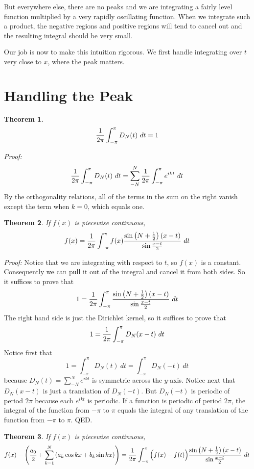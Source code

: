 \documentclass[11pt, oneside]{amsart}
\newtheorem{theorem}{Theorem}
\begin{document}
But everywhere else, there are no peaks and we are integrating a fairly level function multiplied by a very rapidly oscillating function. When we integrate such a product, the negative regions and positive regions will tend to cancel out and the resulting integral should be very small.

Our job is now to make this intuition rigorous. We first handle integrating over $t$ very close to $x$, where the peak matters.

\section{Handling the Peak}


\begin{theorem}
$${1 \over {2 \pi}} \int_{- \pi}^\pi D_N(t)\ dt = 1$$
\end{theorem}

{\em Proof:}
	$${1 \over {2 \pi}} \int_{- \pi}^\pi D_N(t)\ dt = \sum_{-N}^N {1 \over {2 \pi}} \int_{- \pi}^\pi e^{ikt} \ dt$$
	By the orthogonality relations, all of the terms in the sum on the right vanish except the term when $k = 0$, which equals one.

\begin{theorem} If $f(x)$ is piecewise continuous,
$$f(x) =  {1 \over {2 \pi}} \int_{- \pi}^\pi f(x)  {{\sin \left(N + {1 \over 2}\right)(x - t)} \over {\sin {{x - t} \over 2}}} \ dt$$
\end{theorem}

{\em Proof:} Notice that we are integrating with respect to $t$, so $f(x)$ is a constant. Consequently we can pull it out of the integral and cancel it from both sides. So it suffices to prove that
$$1 = {1 \over {2 \pi}} \int_{- \pi}^\pi  {{\sin \left(N + {1 \over 2}\right)(x - t)} \over {\sin {{x - t} \over 2}}} \ dt$$
The right hand side is just the Dirichlet kernel, so it suffices to prove that
$$1 = {1 \over {2 \pi}} \int_{-\pi}^\pi D_N(x - t)\ dt$$
Notice first that 
$$1 = \int_{- \pi}^\pi D_N(t) \ dt = \int_{- \pi}^\pi D_N(-t) \ dt$$
because $D_N(t) = \sum_{-N}^N e^{ikt}$ is symmetric across the $y$-axis. Notice next that $D_N(x - t)$ is just a translation of $D_N(-t)$. But $D_N(-t)$ is periodic of period $2 \pi$ because each $e^{ikt}$ is periodic. If a function is periodic of period $2 \pi$, the integral of the function from $- \pi$ to $\pi$ equals the integral of any translation of the function from $-\pi$ to $\pi$. QED.

\begin{theorem} If $f(x)$ is piecewise continuous,
$$f(x) - \left({{a_0} \over 2} + \sum_{k = 1}^N \left( a_k \cos kx + b_k \sin kx \right)\right) =  {1 \over {2 \pi}} \int_{- \pi}^\pi \Big( f(x) - f(t)\Big) {{\sin \left(N + {1 \over 2}\right)(x - t)} \over {\sin {{x - t} \over 2}}} \ dt$$
\end{theorem}
\end{document}

